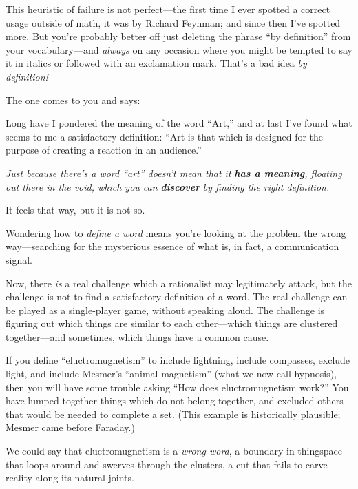 {
 This heuristic of failure is not perfect---the first time I ever
spotted a correct usage outside of math, it was by Richard Feynman; and
since then I've spotted more. But
you're probably better off just deleting the phrase
``by definition'' from your
vocabulary---and \textit{always} on any occasion where you might be
tempted to say it in italics or followed with an exclamation mark.
That's a bad idea \textit{by definition!}}

\myendsectiontext


{
 The one comes to you and says:}

{
 Long have I pondered the meaning of the word
``Art,'' and at last
I've found what seems to me a satisfactory definition:
``Art is that which is designed for the purpose of
creating a reaction in an audience.''}

{
 \textit{Just because there's a word
``art'' doesn't mean
that it }\textbf{\textit{has a meaning}}\textit{, floating out there in
the void, which you can }\textbf{\textit{discover}}\textit{ by finding
the right definition.}}

{
 It feels that way, but it is not so.}

{
 Wondering how to \textit{define a word} means
you're looking at the problem the wrong way---searching
for the mysterious essence of what is, in fact, a communication
signal.}

{
 Now, there \textit{is} a real challenge which a rationalist may
legitimately attack, but the challenge is not to find a satisfactory
definition of a word. The real challenge can be played as a
single-player game, without speaking aloud. The challenge is figuring
out which things are similar to each other---which things are clustered
together---and sometimes, which things have a common cause.}

{
 If you define
``eluctromugnetism'' to include
lightning, include compasses, exclude light, and include
Mesmer's ``animal
magnetism'' (what we now call hypnosis), then you
will have some trouble asking ``How does
eluctromugnetism work?'' You have lumped together
things which do not belong together, and excluded others that would be
needed to complete a set. (This example is historically plausible;
Mesmer came before Faraday.)}

{
 We could say that eluctromugnetism is a \textit{wrong word}, a
boundary in thingspace that loops around and swerves through the
clusters, a cut that fails to carve reality along its natural joints.}

